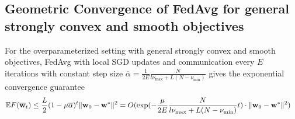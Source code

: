 
\subsection{Geometric Convergence of FedAvg for general strongly convex and smooth objectives}

\begin{thm}
	For the overparameterized setting with general strongly convex and
	smooth objectives, FedAvg with local SGD updates and communication
	every $E$ iterations with constant step size $\overline{\alpha}=\frac{1}{2E}\frac{N}{l\nu_{\max}+L(N-\nu_{\min})}$
	gives the exponential convergence guarantee 
	\begin{align*}
	\mathbb{E}F({\overline{\mathbf{w}}}_{t}) & \leq\frac{L}{2}(1-\mu\overline{\alpha})^{t}\|{\mathbf{w}}_{0}-{\mathbf{w}}^{\ast}\|^{2}=O(\exp(-\frac{\mu}{2E}\frac{N}{l\nu_{\max}+L(N-\nu_{\min})}t)\cdot\|{\mathbf{w}}_{0}-{\mathbf{w}}^{\ast}\|^{2})
	\end{align*}
\end{thm}
%
